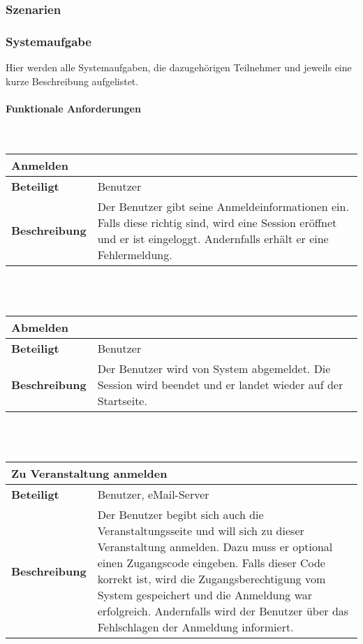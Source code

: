 \documentclass[12pt,a4paper]{article}
\begin{document}
\subsubsection{Szenarien}
\subsubsection{Systemaufgabe}
Hier werden alle Systemaufgaben, die dazugehörigen Teilnehmer und jeweils eine kurze Beschreibung aufgelistet.
\paragraph{Funktionale Anforderungen}\mbox{}\\

\begin{tabular}{l p{10cm}}
\multicolumn{2}{l}{\textbf{Anmelden}} \\ \hline
\textbf{Beteiligt} & Benutzer \\ \hline 
\textbf{Beschreibung} & Der Benutzer gibt seine Anmeldeinformationen ein. Falls diese richtig sind, wird eine Session eröffnet und er ist eingeloggt. Andernfalls erhält er eine Fehlermeldung. \\ 
\hline 
\end{tabular}\\\\

\begin{tabular}{l p{10cm}}
\multicolumn{2}{l}{\textbf{Abmelden}} \\ \hline
\textbf{Beteiligt} & Benutzer \\ \hline 
\textbf{Beschreibung} & Der Benutzer wird von System abgemeldet. Die Session wird beendet und er landet wieder auf der Startseite. \\ 
\hline 
\end{tabular}\\\\

\begin{tabular}{l p{10cm}}
\multicolumn{2}{l}{\textbf{Zu Veranstaltung anmelden}} \\ \hline
\textbf{Beteiligt} & Benutzer, eMail-Server \\ \hline 
\textbf{Beschreibung} & Der Benutzer begibt sich auch die Veranstaltungsseite und will sich zu dieser Veranstaltung anmelden. Dazu muss er optional einen Zugangscode eingeben. Falls dieser Code korrekt ist, wird die Zugangsberechtigung vom System gespeichert und die Anmeldung war erfolgreich. Andernfalls wird der Benutzer über das Fehlschlagen der Anmeldung informiert. \\ 
\hline 
\end{tabular}\\\\
\end{document}
